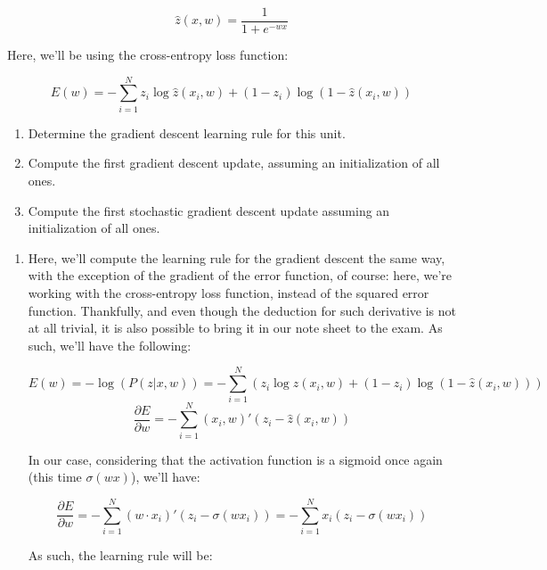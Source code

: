 \documentclass[12pt]{article}
\begin{document}
\begin{enumerate}[leftmargin=\labelsep]
\begin{tcolorbox}[enhanced jigsaw,colback=bg,boxrule=0pt,arc=1pt,halign=center]
    \begin{equation*}
      \hat{z}(x, w) = \frac{1}{1 + e^{-w x}}
    \end{equation*}

    Here, we'll be using the cross-entropy loss function:

    \begin{equation*}
      E(w) = - \sum_{i=1}^N z_i \log \hat{z}(x_i, w) + (1 - z_i) \log (1 - \hat{z}(x_i, w))
    \end{equation*}

    \begin{enumerate}
      \item Determine the gradient descent learning rule for this unit.
      \item Compute the first gradient descent update, assuming an initialization of all ones.
      \item Compute the first stochastic gradient descent update assuming an initialization of all ones.
    \end{enumerate}
  \end{tcolorbox}

  \begin{enumerate}
    \item {
          Here, we'll compute the learning rule for the gradient descent the same way,
          with the exception of the gradient of the error function, of course: here,
          we're working with the cross-entropy loss function, instead of the squared
          error function. Thankfully, and even though the deduction for such derivative
          is not at all trivial, it is also possible to bring it in our note sheet
          to the exam. As such, we'll have the following:

          $$
            E(w) = - \log(P(z|x, w)) = - \sum_{i=1}^N (z_i \log \hat{z}(x_i, w) + (1 - z_i) \log (1 - \hat{z}(x_i, w)))
          $$
          $$
            \frac{\partial E}{\partial w} = - \sum_{i=1}^N (x_i, w)' (z_i - \hat{z}(x_i, w))
          $$

          In our case, considering that the activation function is a sigmoid once again
          (this time $\sigma(wx)$), we'll have:

          $$
            \frac{\partial E}{\partial w} = - \sum_{i=1}^N (w \cdot x_i)' (z_i - \sigma(w x_i))
            = - \sum_{i=1}^N x_i (z_i - \sigma(w x_i))
          $$

          As such, the learning rule will be:

}
\end{enumerate}
\end{enumerate}
\end{document}
